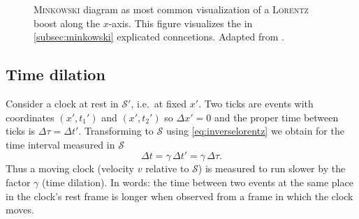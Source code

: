 \documentclass[12pt,
               open=any,
               twoside,
               a4paper,
               titlepage,
               bibliography=totoc,
               xcolor=dvipsnames,
               ]{scrartcl}
\theoremstyle{definition}
\theoremstyle{definition}
\begin{document}
\newpage
			
				\begin{figure}[h]
					\centering
					\label{subfig:lorentz}
					\;
					\label{subfig:inverselorentz}
					\caption{\textsc{Minkowski} diagram as most common visualization of a \textsc{Lorentz} boost along the $x$-axis. This figure visualizes the in \autoref{subsec:minkowski} explicated conncetions. Adapted from \textcite{neutelings}.}
					\label{fig:lorentz}
				\end{figure}
			
			\subsection{Time dilation}
				Consider a clock at rest in $\mathcal S'$, i.e.\ at fixed $x'$. Two ticks are events with coordinates $(x',t_1')$ and $(x',t_2')$ so $\Delta x'=0$ and the proper time between ticks is $\Delta \tau = \Delta t'$. Transforming to $\mathcal S$ using \autoref{eq:inverselorentz} we obtain for the time interval measured in $\mathcal S$
				\begin{equation}
					\boxed{\Delta t = \gamma\,\Delta t'} = \gamma\,\Delta \tau.
					\label{eq:timedilation}
				\end{equation}
				Thus a moving clock (velocity $v$ relative to $\mathcal S$) is measured to run slower by the factor $\gamma$ (time dilation). In words: the time between two events at the same place in the clock's rest frame is longer when observed from a frame in which the clock moves.
			
\end{document}
